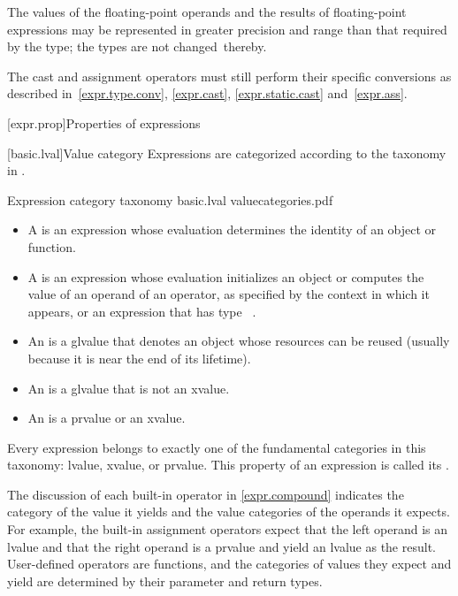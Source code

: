 \pnum
The values of the floating-point operands and
the results of floating-point expressions
may be represented in greater precision and range than that
required by the type; the types are not changed\
thereby.
\begin{footnote}
The cast and assignment operators must still perform their specific
conversions as described in~\ref{expr.type.conv}, \ref{expr.cast},
\ref{expr.static.cast} and~\ref{expr.ass}.
\end{footnote}

[expr.prop]{Properties of expressions}

[basic.lval]{Value category}
\pnum
Expressions are categorized according to the taxonomy in .

\begin{importgraphic}
{Expression category taxonomy}
{basic.lval}
{valuecategories.pdf}
\end{importgraphic}

\begin{itemize}
\item A  is an expression whose evaluation determines the identity of an object or function.
\item A \defn{prvalue} is an expression whose evaluation initializes an object
or computes the value of an operand of an operator,
as specified by the context in which it appears,
or an expression that has type \cv{}~.
\item An  is a glvalue that denotes an object whose resources can be reused (usually because it is near the end of its lifetime).
\item An \defn{lvalue} is a glvalue that is not an xvalue.
\item An  is a prvalue or an xvalue.
\end{itemize}

\pnum
Every expression belongs to exactly one of the fundamental categories in this
taxonomy: lvalue, xvalue, or prvalue. This property of an expression is called
its \defn{value category}.
\begin{note}
The discussion of each built-in operator in
\ref{expr.compound} indicates the category of the value it yields and the value categories
of the operands it expects. For example, the built-in assignment operators expect that
the left operand is an lvalue and that the right operand is a prvalue and yield an
lvalue as the result. User-defined operators are functions, and the categories of
values they expect and yield are determined by their parameter and return types.
\end{note}

